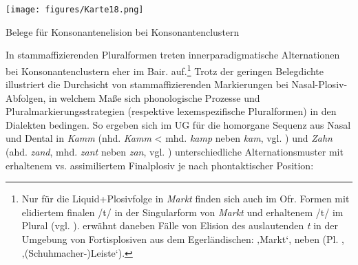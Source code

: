 \begin{map}
\texttt{[image: figures/Karte18.png]}
\caption{Belege für Konsonantenelision bei Konsonantenclustern}
\label{map:18}
\end{map}


In stammaffizierenden Pluralformen treten innerparadigmatische Alternationen bei Konsonantenclustern eher im Bair. auf.\footnote{Nur für die Liquid+Plosivfolge in \textit{Markt} finden sich auch im Ofr. Formen mit elidiertem finalen /t/ in der Singularform von \textit{Markt} und erhaltenem /t/ im Plural (vgl. 	). \citet[127]{Roth1940} erwähnt daneben Fälle von Elision des auslautenden \textit{t} in der Umgebung von Fortisplosiven aus dem Egerländischen:  ‚Markt‘,  neben  (Pl. , ‚(Schuhmacher-)Leiste‘).} Trotz der geringen Belegdichte illustriert die Durchsicht von stammaffizierenden Markierungen bei Nasal-Plosiv-Abfolgen, in welchem Maße sich phonologische Prozesse und Pluralmarkierungsstrategien (respektive lexemspezifische Pluralformen) in den Dialekten bedingen. So ergeben sich im UG für die homorgane Sequenz aus Nasal und Dental in \textit{Kamm} (nhd. \textit{Kamm} < mhd. \textit{kamp} neben \textit{kam}, vgl. \citealt[I.783b]{Lexer1872-1878}) und \textit{Zahn} (ahd. \textit{zand}, mhd. \textit{zant} neben \textit{zan}, vgl. \citealt[III.848a]{Lexer1872-1878}) unterschiedliche Alternationsmuster mit erhaltenem vs. assimiliertem Finalplosiv je nach phontaktischer Position:\largerpage[-1]

